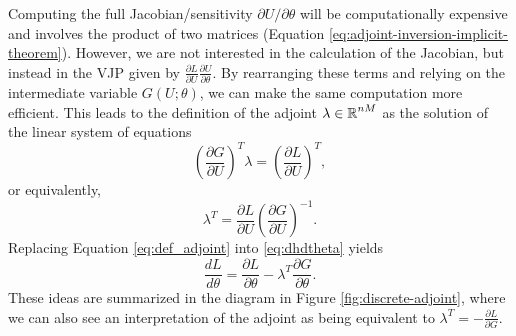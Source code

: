 Computing the full Jacobian/sensitivity $\partial U / \partial \theta$ will be computationally expensive and involves the product of two matrices (Equation \eqref{eq:adjoint-inversion-implicit-theorem}). 
However, we are not interested in the calculation of the Jacobian, but instead in the VJP given by $\frac{\partial L}{\partial U} \frac{\partial U}{\partial \theta}$. 
By rearranging these terms and relying on the intermediate variable $G(U; \theta)$, we can make the same computation more efficient. 
This leads to the definition of the adjoint $\lambda \in \operatorname{\mathbb{R}}^{nM}$ as the solution of the linear system of equations 
\begin{equation}
    \left( \frac{\partial G}{\partial U}\right)^T \lambda 
    =  
    \left( \frac{\partial L}{\partial U} \right)^T,
    \label{eq:adjoint-state-equation}
\end{equation}
or equivalently,
\begin{equation}
    \lambda^T = \frac{\partial L}{\partial U} \left( \frac{\partial G}{\partial U} \right)^{-1}.
    \label{eq:def_adjoint}
\end{equation}
Replacing Equation \eqref{eq:def_adjoint} into \eqref{eq:dhdtheta} yields
\begin{equation}
    \frac{dL}{d\theta} 
    =
    \frac{\partial L}{\partial \theta} 
    - 
    \lambda^T \frac{\partial G}{\partial \theta}.
    \label{eq:gradient-adjoint-state-method}
\end{equation}
These ideas are summarized in the diagram in Figure \ref{fig:discrete-adjoint}, where we can also see an interpretation of the adjoint as being equivalent to $\lambda^T = - \frac{\partial L}{\partial G}$. 

